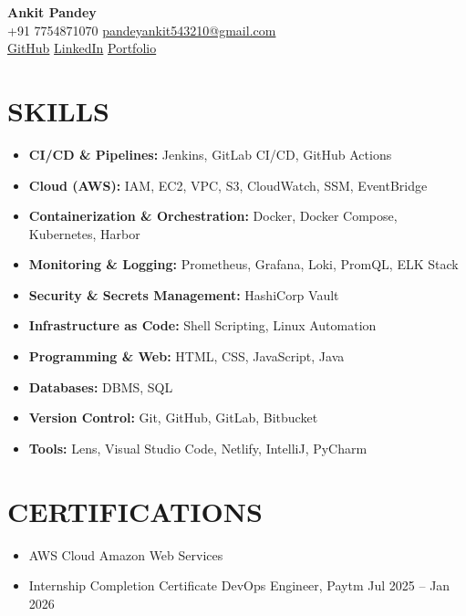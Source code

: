\documentclass[10pt,letterpaper]{article}
\begin{document}
\thispagestyle{empty}

\begin{center}
{\Large \textbf{Ankit Pandey}}\\[0.25em]
+91 7754871070 \textemdash{} \href{mailto:pandeyankit543210@gmail.com}{pandeyankit543210@gmail.com}\\[0.15em]
\href{https://github.com/ankitlabz}{GitHub} \textemdash{} \href{https://www.linkedin.com/in/ankit-pandey3}{LinkedIn} \textemdash{} \href{https://ankitlabz.github.io/portfolio}{Portfolio}
\end{center}

\vspace{-0.5em}
\section*{SKILLS}
\begin{itemize}[leftmargin=1em]
\item \textbf{CI/CD \& Pipelines:} Jenkins, GitLab CI/CD, GitHub Actions
\item \textbf{Cloud (AWS):} IAM, EC2, VPC, S3, CloudWatch, SSM, EventBridge
\item \textbf{Containerization \& Orchestration:} Docker, Docker Compose, Kubernetes, Harbor
\item \textbf{Monitoring \& Logging:} Prometheus, Grafana, Loki, PromQL, ELK Stack
\item \textbf{Security \& Secrets Management:} HashiCorp Vault
\item \textbf{Infrastructure as Code:} Shell Scripting, Linux Automation
\item \textbf{Programming \& Web:} HTML, CSS, JavaScript, Java
\item \textbf{Databases:} DBMS, SQL
\item \textbf{Version Control:} Git, GitHub, GitLab, Bitbucket
\item \textbf{Tools:} Lens, Visual Studio Code, Netlify, IntelliJ, PyCharm
\end{itemize}

\section*{CERTIFICATIONS}
\begin{itemize}[leftmargin=1em]
\item AWS Cloud \textemdash{} Amazon Web Services
\item Internship Completion Certificate \textemdash{} DevOps Engineer, Paytm Jul 2025 -- Jan 2026
\end{itemize}
\end{document}
